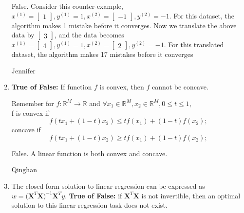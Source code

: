\begin{enumerate}
    \begin{soln}
    False. Consider this counter-example, $x^{(1)} = \begin{bmatrix} 1 \end{bmatrix}, y^{(1)} = 1, x^{(2)} = \begin{bmatrix} -1 \end{bmatrix}, y^{(2)} = -1$. For this dataset, the algorithm makes 1 mistake before it converges. Now we translate the above data by $\begin{bmatrix} 3 \end{bmatrix}$, and the data becomes $x^{(1)} = \begin{bmatrix} 4 \end{bmatrix}, y^{(1)} = 1, x^{(2)} = \begin{bmatrix} 2 \end{bmatrix}, y^{(2)} = -1$. For this translated dataset, the algorithm makes 17 mistakes before it converges
    \end{soln}
    
    \begin{qauthor}
    Jennifer
    \end{qauthor}
    
        
    \item \textbf{True of False:} If function $f$ is convex, then $f$ cannot be concave.
    
    Remember for $f:\mathbb{R}^{M} \rightarrow \mathbb{R}$ and $\forall x_1 \in \mathbb{R}^{M}, x_2 \in \mathbb{R}^{M}, 0\leqslant t\leqslant 1$, \\ f is convex if 
    \begin{equation}
        f(tx_1 + (1-t)x_2) \leqslant tf(x_1) + (1-t)f(x_2);
    \end{equation} concave if 
    \begin{equation}
        f(tx_1 + (1-t)x_2) \geqslant tf(x_1) + (1-t)f(x_2);
    \end{equation}

    \begin{soln}
    False. A linear function is both convex and concave.
    \end{soln}
    
    \begin{qauthor}
    Qinghan
    \end{qauthor}
    
    
    \item The closed form solution to linear regression can be expressed as $w = \big( \mathbf{X}^T \mathbf{X}\big)^{-1}\mathbf{X}^Ty$. \textbf{True of False:} if $\mathbf{X}^T \mathbf{X}$ is not invertible, then an optimal solution to this linear regression task does not exist.
    

\end{enumerate}
